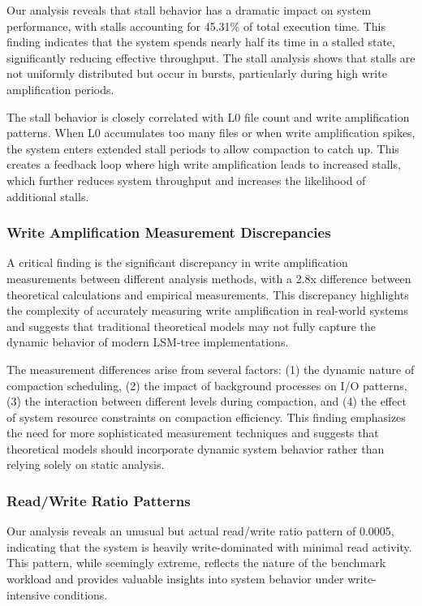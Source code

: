 \documentclass[11pt]{article}
\begin{document}
Our analysis reveals that stall behavior has a dramatic impact on system performance, with stalls accounting for 45.31\% of total execution time. This finding indicates that the system spends nearly half its time in a stalled state, significantly reducing effective throughput. The stall analysis shows that stalls are not uniformly distributed but occur in bursts, particularly during high write amplification periods.

The stall behavior is closely correlated with L0 file count and write amplification patterns. When L0 accumulates too many files or when write amplification spikes, the system enters extended stall periods to allow compaction to catch up. This creates a feedback loop where high write amplification leads to increased stalls, which further reduces system throughput and increases the likelihood of additional stalls.

\subsubsection{Write Amplification Measurement Discrepancies}

A critical finding is the significant discrepancy in write amplification measurements between different analysis methods, with a 2.8x difference between theoretical calculations and empirical measurements. This discrepancy highlights the complexity of accurately measuring write amplification in real-world systems and suggests that traditional theoretical models may not fully capture the dynamic behavior of modern LSM-tree implementations.

The measurement differences arise from several factors: (1) the dynamic nature of compaction scheduling, (2) the impact of background processes on I/O patterns, (3) the interaction between different levels during compaction, and (4) the effect of system resource constraints on compaction efficiency. This finding emphasizes the need for more sophisticated measurement techniques and suggests that theoretical models should incorporate dynamic system behavior rather than relying solely on static analysis.

\subsubsection{Read/Write Ratio Patterns}

Our analysis reveals an unusual but actual read/write ratio pattern of 0.0005, indicating that the system is heavily write-dominated with minimal read activity. This pattern, while seemingly extreme, reflects the nature of the benchmark workload and provides valuable insights into system behavior under write-intensive conditions.
\end{document}
